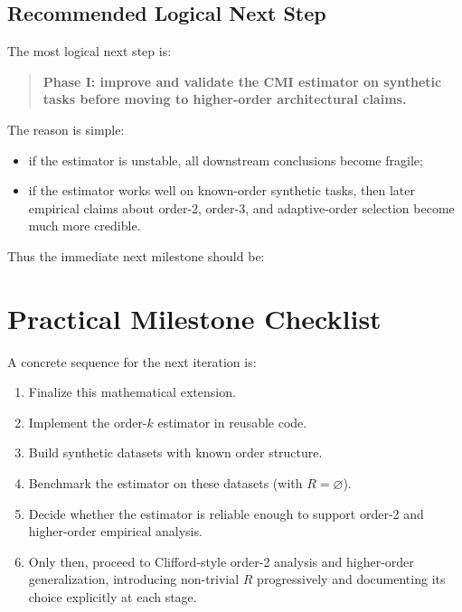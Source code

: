 \documentclass[11pt]{article}
\newcommand{\1}{\mathbf{1}}
\begin{document}
\subsection{Recommended Logical Next Step}

The most logical next step is:

\begin{quote}
\textbf{Phase I: improve and validate the CMI estimator on synthetic tasks before moving to
higher-order architectural claims.}
\end{quote}

The reason is simple:
\begin{itemize}[leftmargin=1.5em]
    \item if the estimator is unstable, all downstream conclusions become fragile;
    \item if the estimator works well on known-order synthetic tasks, then later empirical claims
    about order-2, order-3, and adaptive-order selection become much more credible.
\end{itemize}

Thus the immediate next milestone should be:

\begin{center}
\end{center}

\section{Practical Milestone Checklist}

A concrete sequence for the next iteration is:

\begin{enumerate}[leftmargin=1.5em]
    \item Finalize this mathematical extension.
    \item Implement the order-$k$ estimator in reusable code.
    \item Build synthetic datasets with known order structure.
    \item Benchmark the estimator on these datasets (with $R = \varnothing$).
    \item Decide whether the estimator is reliable enough to support order-2 and higher-order
    empirical analysis.
    \item Only then, proceed to Clifford-style order-2 analysis and higher-order generalization,
    introducing non-trivial $R$ progressively and documenting its choice explicitly at each stage.
\end{enumerate}
\end{document}
